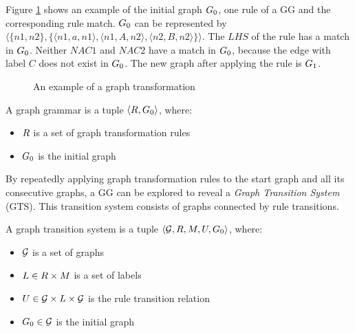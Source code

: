 Figure \ref{fig:gg_example} shows an example of the initial graph $G_0$, one rule of a GG and the corresponding rule match. $G_0$ can be represented by $\langle\{n1,n2\},\{\langle n1,a,n1\rangle, \langle n1,A,n2\rangle,\langle n2,B,n2\rangle\}\rangle$. The $\mathit{LHS}$ of the rule has a match in $G_0$. Neither $\mathit{NAC1}$ and $\mathit{NAC2}$ have a match in $G_0$, because the edge with label $C$ does not exist in $G_0$. The new graph after applying the rule is $G_1$.

\begin{figure}[ht]
  \begin{center}
    
  \end{center}
  \caption{An example of a graph transformation}
  \label{fig:gg_example}
\end{figure}

\vspace{5px}
\begin{definition}
A graph grammar is a tuple $\langle R, G_0 \rangle$, where:
\begin{itemize}
\item $R$ is a set of graph transformation rules
\item $G_0$ is the initial graph
\end{itemize}
\end{definition}
\vspace{5px}

By repeatedly applying graph transformation rules to the start graph and all its consecutive graphs, a GG can be explored to reveal a \textit{Graph Transition System} (GTS). This transition system consists of graphs connected by rule transitions.

\vspace{5px}
\begin{definition}
A graph transition system is a tuple	$\langle \mathcal{G}, R, M, U, G_0\rangle$, where:
\begin{itemize}
\item $\mathcal{G}$ is a set of graphs
\item $L \in R \times M$ is a set of labels
\item $U \in \mathcal{G} \times L \times \mathcal{G}$ is the rule transition relation
\item $G_0 \in \mathcal{G}$ is the initial graph
\end{itemize}
\end{definition}
\vspace{5px}

